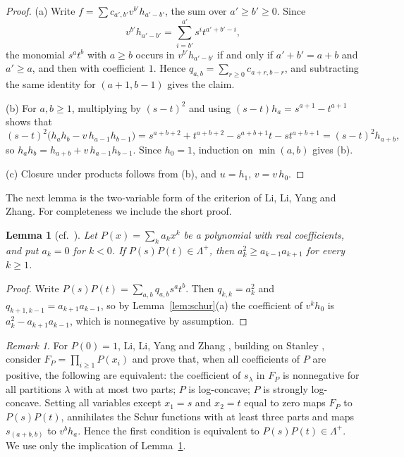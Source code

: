 \documentclass{amsart}
\newtheorem{lemma}[theorem]{Lemma}
\theoremstyle{definition}
\theoremstyle{remark}
\newtheorem{remark}[theorem]{Remark}
\numberwithin{equation}{section}
\newcommand{\Lp}{\Lambda^{+}}
\begin{document}
\begin{proof}
(a) Write $f=\sum c_{a',b'}v^{b'}h_{a'-b'}$, the sum over $a'\ge b'\ge0$. Since
\[
v^{b'}h_{a'-b'}=\sum_{i=b'}^{a'}s^it^{a'+b'-i},
\]
the monomial $s^at^b$ with $a\ge b$ occurs in $v^{b'}h_{a'-b'}$ if and only if $a'+b'=a+b$ and $a'\ge a$, and then with coefficient $1$. Hence $q_{a,b}=\sum_{r\ge0}c_{a+r,b-r}$, and subtracting the same identity for $(a+1,b-1)$ gives the claim.

(b) For $a,b\ge1$, multiplying by $(s-t)^2$ and using $(s-t)h_a=s^{a+1}-t^{a+1}$ shows that
\[
(s-t)^2\bigl(h_ah_b-v\,h_{a-1}h_{b-1}\bigr)
=s^{a+b+2}+t^{a+b+2}-s^{a+b+1}t-st^{a+b+1}
=(s-t)^2h_{a+b},
\]
so $h_ah_b=h_{a+b}+v\,h_{a-1}h_{b-1}$. Since $h_0=1$, induction on $\min(a,b)$ gives (b).

(c) Closure under products follows from (b), and $u=h_1$, $v=v\,h_0$.
\end{proof}

The next lemma is the two-variable form of the criterion of Li, Li, Yang and Zhang. For completeness we include the short proof.

\begin{lemma}[{cf.\ \cite[Theorem~1.3]{LLYZ}}]\label{lem:lc}
Let $P(x)=\sum_ka_kx^k$ be a polynomial with real coefficients, and put $a_k=0$ for $k<0$. If $P(s)P(t)\in\Lp$, then $a_k^2\ge a_{k-1}a_{k+1}$ for every $k\ge1$.
\end{lemma}

\begin{proof}
Write $P(s)P(t)=\sum_{a,b}q_{a,b}s^at^b$. Then $q_{k,k}=a_k^2$ and $q_{k+1,k-1}=a_{k+1}a_{k-1}$, so by Lemma~\ref{lem:schur}(a) the coefficient of $v^kh_0$ is $a_k^2-a_{k+1}a_{k-1}$, which is nonnegative by assumption.
\end{proof}

\begin{remark}
For $P(0)=1$, Li, Li, Yang and Zhang \cite[Theorem~1.3]{LLYZ}, building on Stanley \cite[Theorem~2.11]{Sta98}, consider $F_P=\prod_{i\ge1}P(x_i)$ and prove that, when all coefficients of $P$ are positive, the following are equivalent: the coefficient of $s_\lambda$ in $F_P$ is nonnegative for all partitions $\lambda$ with at most two parts; $P$ is log-concave; $P$ is strongly log-concave. Setting all variables except $x_1=s$ and $x_2=t$ equal to zero maps $F_P$ to $P(s)P(t)$, annihilates the Schur functions with at least three parts and maps $s_{(a+b,b)}$ to $v^bh_a$. Hence the first condition is equivalent to $P(s)P(t)\in\Lp$. We use only the implication of Lemma~\ref{lem:lc}.
\end{remark}
\end{document}
